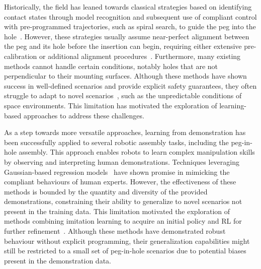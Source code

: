 Historically, the field has leaned towards classical strategies based on identifying contact states through model recognition and subsequent use of compliant control with pre-programmed trajectories, such as spiral search, to guide the peg into the hole~\cite{jasim2017contact,lee2022contact}. However, these strategies usually assume near-perfect alignment between the peg and its hole before the insertion can begin, requiring either extensive pre-calibration or additional alignment procedures~\cite{tang2016autonomous}. Furthermore, many existing methods cannot handle certain conditions, notably holes that are not perpendicular to their mounting surfaces. Although these methods have shown success in well-defined scenarios and provide explicit safety guarantees, they often struggle to adapt to novel scenarios~\cite{xu2019compare}, such as the unpredictable conditions of space environments. This limitation has motivated the exploration of learning-based approaches to address these challenges.

As a step towards more versatile approaches, learning from demonstration has been successfully applied to several robotic assembly tasks, including the peg-in-hole assembly. This approach enables robots to learn complex manipulation skills by observing and interpreting human demonstrations. Techniques leveraging Gaussian-based regression models~\cite{tang2016teach,wan2017optimal} have shown promise in mimicking the compliant behaviours of human experts. However, the effectiveness of these methods is bounded by the quantity and diversity of the provided demonstrations, constraining their ability to generalize to novel scenarios not present in the training data. This limitation motivated the exploration of methods combining imitation learning to acquire an initial policy and RL for further refinement~\cite{cho2020learning,wang2023learning}. Although these methods have demonstrated robust behaviour without explicit programming, their generalization capabilities might still be restricted to a small set of peg-in-hole scenarios due to potential biases present in the demonstration data.

